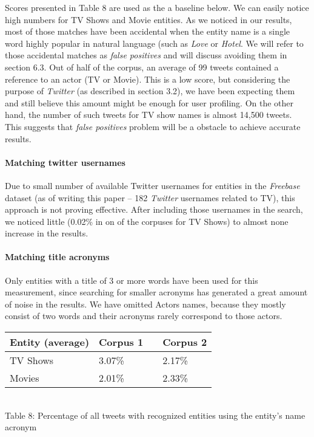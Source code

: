 Scores presented in Table 8 are used as the a baseline below. We can easily notice high numbers for TV Shows and
Movie entities. As we noticed in our results, most of those matches have been accidental when the entity name is a single
word highly popular in natural language (such as \textit{Love} or \textit{Hotel}. We will refer to those accidental
matches as \textit{false positives} and will discuss avoiding them in section 6.3. Out of half of the corpus, an average of 99 tweets contained a reference to an actor (TV or Movie). This is a low score, but considering the purpose of \textit{Twitter} (as described in section 3.2), we have been expecting them and still believe this amount might be enough for user profiling. On the other hand, the number of such tweets for TV show names is almost 14,500 tweets. This suggests
that \textit{false positives} problem will be a obstacle to achieve accurate results.

\paragraph{Matching twitter usernames}
Due to small number of available Twitter usernames for entities in the \textit{Freebase} dataset (as of writing this paper -- 182 \textit{Twitter} usernames related to TV), this approach is not proving effective. After including those usernames in the search,
we noticed little (0.02\% in on of the corpuses for TV Shows) to almost none increase in the results.

\paragraph{Matching title acronyms}
Only entities with a title of 3 or more words have been used for this measurement, since searching
for smaller acronyms has generated a great amount of noise in the results. We have omitted Actors names, because
they mostly consist of two words and their acronyms rarely correspond to those actors.

\begin{center}
  \begin{tabular}{ | p{4cm} | p{2cm} | p{1cm}| p{2cm} | } \hline
    Entity (average) & Corpus 1 & & Corpus 2 \\ \hline
    TV Shows & 3.07\% & & 2.17\% \\ \hline
    Movies & 2.01\% & & 2.33\% \\ \hline
  \end{tabular} \\
  Table 8: Percentage of all tweets with recognized entities using the entity's name acronym \\
\end{center}

